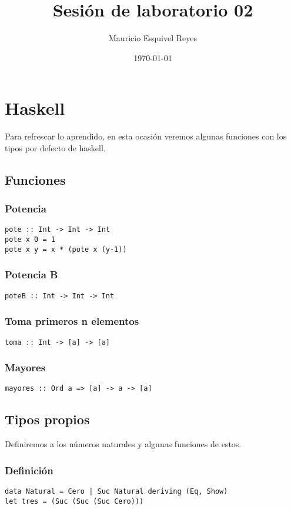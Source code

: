 \documentclass[11pt]{article}
\author{Mauricio Esquivel Reyes}
\date{\today}
\title{Sesión de laboratorio 02}
\begin{document}
\maketitle
\tableofcontents


\section{Haskell}
\label{sec:orgda4522c}
Para refrescar lo aprendido, en esta ocasión veremos algunas funciones con los
tipos por defecto de haskell.
\subsection{Funciones}
\label{sec:org8f76f71}
\subsubsection{Potencia}
\label{sec:org1fe59d9}
\begin{verbatim}
pote :: Int -> Int -> Int
pote x 0 = 1
pote x y = x * (pote x (y-1))
\end{verbatim}
\subsubsection{Potencia B}
\label{sec:org0b40d48}
\begin{verbatim}
poteB :: Int -> Int -> Int
\end{verbatim}
\subsubsection{Toma primeros n elementos}
\label{sec:orge508b38}
\begin{verbatim}
toma :: Int -> [a] -> [a]
\end{verbatim}
\subsubsection{Mayores}
\label{sec:org3c686c0}
\begin{verbatim}
mayores :: Ord a => [a] -> a -> [a]
\end{verbatim}

\subsection{Tipos propios}
\label{sec:orgb68c14a}
Definiremos a los números naturales y algunas funciones de estos.
\subsubsection{Definición}
\label{sec:org28294b0}
\begin{verbatim}
data Natural = Cero | Suc Natural deriving (Eq, Show)
let tres = (Suc (Suc (Suc Cero)))
\end{verbatim}
\end{document}
